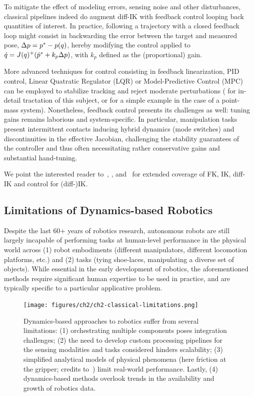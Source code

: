 To mitigate the effect of modeling errors, sensing noise and other disturbances, classical pipelines indeed do augment diff-IK with feedback control looping back quantities of interest.
In practice, following a trajectory with a closed feedback loop might consist in backwarding the error between the target and measured pose, \( \Delta p = p^* - p(q) \), hereby modifying the control applied to \( \dot q = J(q)^+ (\dot {p}^* + k_p \Delta p ) \), with \( k_p \) defined as the (proportional) gain.

More advanced techniques for control consisting in feedback linearization, PID control, Linear Quatratic Regulator (LQR) or Model-Predictive Control (MPC) can be employed to stabilize tracking and reject moderate perturbations (\citep[Chapter~8]{sicilianoSpringerHandbookRobotics2016} for in-detail tractation of this subject, or \citep[Chapter~8]{tedrakeRoboticManipulationPerception} for a simple example in the case of a point-mass system).
Nonetheless, feedback control presents its challenges as well: tuning gains remains laborious and system-specific. 
In particular, manipulation tasks present intermittent contacts inducing hybrid dynamics (mode switches) and discontinuities in the effective Jacobian, challenging the stability guarantees of the controller and thus often necessitating rather conservative gains and substantial hand-tuning.

We point the interested reader to~\citet[Chapter~2,7,8]{sicilianoSpringerHandbookRobotics2016}, \citet[Chapter~6,11]{lynchModernRoboticsMechanics2017}, and~\citet[Chapter~3,8]{tedrakeRoboticManipulationPerception} for extended coverage of FK, IK, diff-IK and control for (diff-)IK.

\subsection{Limitations of Dynamics-based Robotics}
Despite the last 60+ years of robotics research, autonomous robots are still largely incapable of performing tasks at human-level performance in the physical world across (1) robot embodiments (different manipulators, different locomotion platforms, etc.) and (2) tasks (tying shoe-laces, manipulating a diverse set of objects).
While essential in the early development of robotics, the aforementioned methods require significant human expertise to be used in practice, and are typically specific to a particular applicative problem.

\begin{figure}
    \centering
    \texttt{[image: figures/ch2/ch2-classical-limitations.png]}
    \caption{Dynamics-based approaches to robotics suffer from several limitations: (1) orchestrating multiple components poses integration challenges; (2) the need to develop custom processing pipelines for the sensing modalities and tasks considered hinders scalability; (3) simplified analytical models of physical phenomena (here friction at the gripper; credits to~\citet{antonovaReinforcementLearningPivoting2017}) limit real-world performance. Lastly, (4) dynamics-based methods overlook trends in the availability and growth of robotics data.}
    \label{fig:classical-limitations}
\end{figure}

